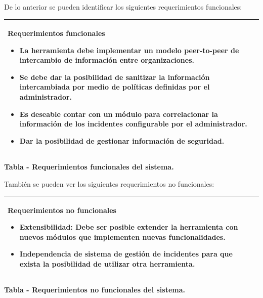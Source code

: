 \bigskip
\newpage
{
	De lo anterior se pueden identificar los siguientes requerimientos funcionales:}
\begin{flushleft}
	\tablefirsthead{}
	\tablehead{}
	\tabletail{}
	\tablelasttail{}
	\begin{supertabular}{|m{5.83516in}|}
		\hline
		\begin{centering}{\bfseries Requerimientos funcionales}
		\end{centering}
		\begin{itemize}
			\item { La herramienta debe implementar un modelo peer-to-peer de intercambio de
				información entre organizaciones.}
			\item { Se debe dar la posibilidad de sanitizar la información intercambiada por medio
				de políticas definidas por el administrador.}
			\item { Es deseable contar con un módulo para correlacionar la información de los
				incidentes configurable por el administrador.}
			\item { Dar la posibilidad de gestionar información de seguridad.}
		\end{itemize}
		\\\hline
	\end{supertabular}
\end{flushleft}
{\centering{}\bfseries
	\foreignlanguage{spanish}{Tabla }\foreignlanguage{spanish}{ - Requerimientos funcionales
		del sistema.}
	\par}
\bigskip
{
	También se pueden ver los siguientes requerimientos no funcionales:}

\begin{flushleft}
	\tablefirsthead{}
	\tablehead{}
	\tabletail{}
	\tablelasttail{}
	\begin{supertabular}{|m{5.83516in}|}
		\hline
		\begin{centering}{\bfseries Requerimientos no funcionales}
		\end{centering}
		\begin{itemize}
			\item { Extensibilidad: Debe ser posible extender la herramienta con nuevos módulos que
				implementen nuevas funcionalidades.}
			\item { Independencia de sistema de gestión de incidentes para que exista la posibilidad de
				utilizar otra herramienta.}
		\end{itemize}
		\\\hline
	\end{supertabular}
\end{flushleft}
{\centering{}\bfseries
	\foreignlanguage{spanish}{Tabla }\foreignlanguage{spanish}{ - Requerimientos no
		funcionales del sistema.}
	\par}


